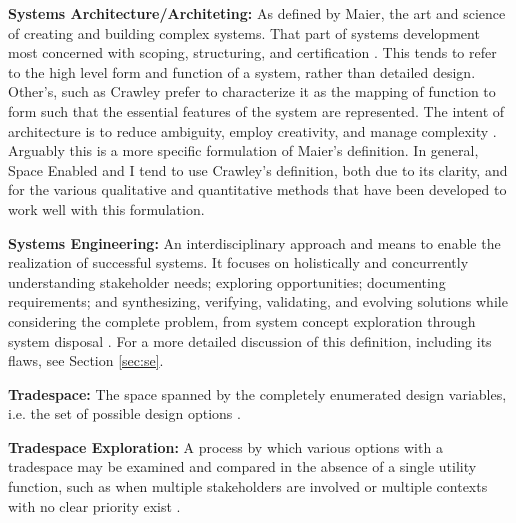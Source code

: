 \textbf{Systems Architecture/Architeting:} As defined by Maier, the art and science of creating and building complex systems. That part of systems development most concerned with scoping, structuring, and certification \cite{maierArtSystemsArchitecting2009}. This tends to refer to the high level form and function of a system, rather than detailed design. Other's, such as Crawley prefer to characterize it as the mapping of function to form such that the essential features of the system are represented. The intent of architecture is to reduce ambiguity, employ creativity, and manage complexity \cite{crawleySystemArchitectureStrategy2015}. Arguably this is a more specific formulation of Maier's definition. In general, Space Enabled and I tend to use Crawley's definition, both due to its clarity, and for the various qualitative and quantitative methods that have been developed to work well with this formulation.

\textbf{Systems Engineering:} An interdisciplinary approach and means to enable the realization of successful systems. It focuses on holistically and concurrently understanding stakeholder needs; exploring opportunities; documenting requirements; and synthesizing, verifying, validating, and evolving solutions while considering the complete problem, from system concept exploration through system disposal \cite{systemsengineeringbodyofknowledgeSystemsEngineeringGlossary2021}. 
For a more detailed discussion of this definition, including its flaws, see Section \ref{sec:se}.

\textbf{Tradespace:}  The space spanned by the completely enumerated design variables, i.e. the set of possible design options \cite{rossTradespaceExplorationParadigm2005}.

\textbf{Tradespace Exploration:} A process by which various options with a tradespace may be examined and compared in the absence of a single utility function, such as when multiple stakeholders are involved or multiple contexts with no clear priority exist \cite{rossTradespaceExplorationParadigm2005}.

\clearpage
\newpage
